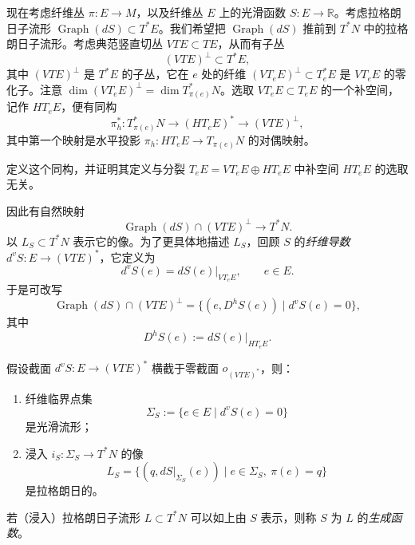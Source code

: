 现在考虑纤维丛 $\pi:E\to M$，以及纤维丛 $E$ 上的光滑函数
$S:E\to\mathbb R$。考虑拉格朗日子流形
$\operatorname{Graph}(dS)\subset T^*E$。我们希望把
$\operatorname{Graph}(dS)$ 推前到 $T^*N$ 中的拉格朗日子流形。考虑典范竖直切丛
$VTE\subset TE$，从而有子丛
\begin{equation}
 (VTE)^\perp\subset T^*E,
 \label{eq:vertical-annihilator-bundle}
\end{equation}
其中 $(VTE)^\perp$ 是 $T^*E$ 的子丛，它在 $e$ 处的纤维
$(VT_eE)^\perp\subset T_e^*E$ 是 $VT_eE$ 的零化子。注意
$\dim(VT_eE)^\perp=\dim T_{\pi(e)}^*N$。选取
$VT_eE\subset T_eE$ 的一个补空间，记作 $HT_eE$，便有同构
\[
 \pi_h^*:T_{\pi(e)}^*N\longrightarrow(HT_eE)^*
 \longrightarrow(VTE)^\perp,
\]
其中第一个映射是水平投影
$\pi_h:HT_eE\to T_{\pi(e)}N$ 的对偶映射。

\begin{exercise}\label{ex:vertical-annihilator-isomorphism}
定义这个同构，并证明其定义与分裂
$T_eE=VT_eE\oplus HT_eE$ 中补空间 $HT_eE$ 的选取无关。
\end{exercise}

因此有自然映射
\begin{equation}
 \operatorname{Graph}(dS)\cap(VTE)^\perp\longrightarrow T^*N.
 \label{eq:generating-function-pushforward-map}
\end{equation}
以 $L_S\subset T^*N$ 表示它的像。为了更具体地描述 $L_S$，回顾 $S$ 的\emph{纤维导数} $d^vS:E\to(VTE)^*$，它定义为
\[
 d^vS(e)=dS(e)|_{VT_eE},\qquad e\in E.
\]
于是可改写
\[
 \operatorname{Graph}(dS)\cap(VTE)^\perp
 =\{(e,D^hS(e))\mid d^vS(e)=0\},
\]
其中
\[
 D^hS(e):=dS(e)|_{HT_eE}.
\]

\begin{proposition}\label{prop:generating-function-lagrangian-immersion}
假设截面 $d^vS:E\to(VTE)^*$ 横截于零截面 $o_{(VTE)^*}$，则：
\begin{enumerate}[label=(\arabic*)]
\item 纤维临界点集
\[
 \Sigma_S:=\{e\in E\mid d^vS(e)=0\}
\]
是光滑流形；
\item 浸入 $i_S:\Sigma_S\to T^*N$ 的像
\[
 L_S=\{(q,dS|_{\Sigma_S}(e))\mid e\in\Sigma_S,\ \pi(e)=q\}
\]
是拉格朗日的。
\end{enumerate}
若（浸入）拉格朗日子流形 $L\subset T^*N$ 可以如上由 $S$ 表示，则称 $S$ 为 $L$ 的\emph{生成函数}。
\end{proposition}

